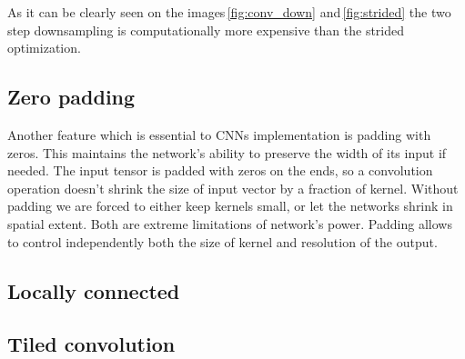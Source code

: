 As it can be clearly seen on the images\,\ref{fig:conv_down} and\,\ref{fig:strided} the two step downsampling is computationally more expensive than the strided optimization.

\subsection{Zero padding}

Another feature which is essential to CNNs implementation is padding with zeros. This maintains the network's ability to preserve the width of its input if needed. The input tensor is padded with zeros on the ends, so a convolution operation doesn't shrink the size of input vector by a fraction of kernel. Without padding we are forced to either keep kernels small, or let the networks shrink in spatial extent. Both are extreme limitations of network's power. Padding allows to control independently both the size of kernel and resolution of the output.

\subsection{Locally connected}


\subsection{Tiled convolution}


